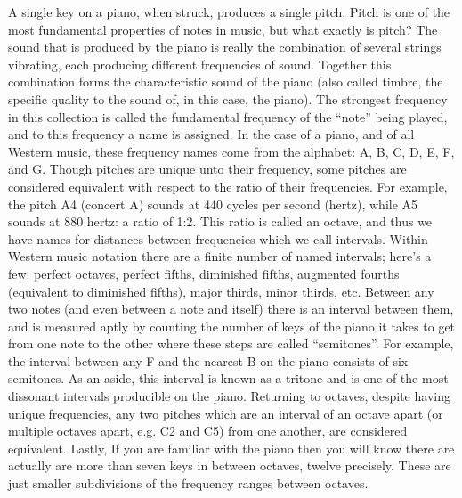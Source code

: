 \documentclass{article}
\begin{document}
A single key on a piano, when struck, produces a single pitch. Pitch is one of
the most fundamental properties of notes in music, but what exactly is pitch?
The sound that is produced by the piano is really the combination of several
strings vibrating, each producing different frequencies of sound. Together this
combination forms the characteristic sound of the piano (also called timbre, the
specific quality to the sound of, in this case, the piano). The strongest
frequency in this collection is called the fundamental frequency of the “note”
being played, and to this frequency a name is assigned. In the case of a piano,
and of all Western music, these frequency names come from the alphabet: A, B, C,
D, E, F, and G. Though pitches are unique unto their frequency, some pitches are
considered equivalent with respect to the ratio of their frequencies. For
example, the pitch A4 (concert A) sounds at 440 cycles per second (hertz), while
A5 sounds at 880 hertz: a ratio of 1:2. This ratio is called an octave, and thus
we have names for distances between frequencies which we call intervals. Within
Western music notation there are a finite number of named intervals; here’s a
few: perfect octaves, perfect fifths, diminished fifths, augmented fourths
(equivalent to diminished fifths), major thirds, minor thirds, etc. Between any
two notes (and even between a note and itself) there is an interval between
them, and is measured aptly by counting the number of keys of the piano it takes
to get from one note to the other where these steps are called “semitones”. For
example, the interval between any F and the nearest B on the piano consists of
six semitones. As an aside, this interval is known as a tritone and is one of
the most dissonant intervals producible on the piano. Returning to octaves,
despite having unique frequencies, any two pitches which are an interval of an
octave apart (or multiple octaves apart, e.g. C2 and C5) from one another, are
considered equivalent. Lastly, If you are familiar with the piano then you will
know there are actually are more than seven keys in between octaves, twelve
precisely. These are just smaller subdivisions of the frequency ranges between
octaves.
\end{document}
